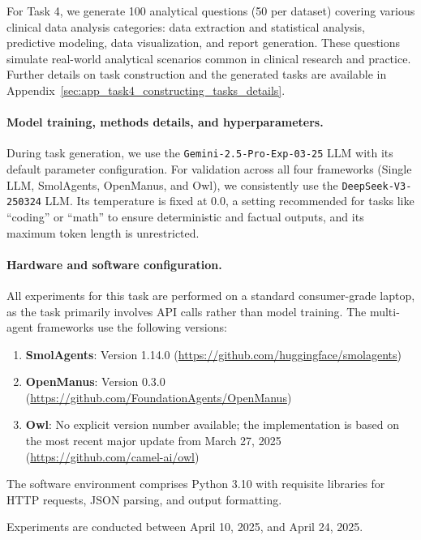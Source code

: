\documentclass{article}
\begin{document}
For Task 4, we generate 100 analytical questions (50 per dataset) covering various clinical data analysis categories: data extraction and statistical analysis, predictive modeling, data visualization, and report generation. These questions simulate real-world analytical scenarios common in clinical research and practice. Further details on task construction and the generated tasks are available in Appendix~\ref{sec:app_task4_constructing_tasks_details}.

\paragraph{Model training, methods details, and hyperparameters.}
\label{sec:app_task4_models_hyperparams}
During task generation, we use the \texttt{Gemini-2.5-Pro-Exp-03-25} LLM with its default parameter configuration. For validation across all four frameworks (Single LLM, SmolAgents, OpenManus, and Owl), we consistently use the \texttt{DeepSeek-V3-250324} LLM. Its temperature is fixed at 0.0, a setting recommended for tasks like ``coding'' or ``math'' to ensure deterministic and factual outputs, and its maximum token length is unrestricted.

\paragraph{Hardware and software configuration.}
\label{sec:app_task4_hardware_software}
All experiments for this task are performed on a standard consumer-grade laptop, as the task primarily involves API calls rather than model training. The multi-agent frameworks use the following versions:
\begin{enumerate}
    \item \textbf{SmolAgents}: Version 1.14.0 (\url{https://github.com/huggingface/smolagents})
    \item \textbf{OpenManus}: Version 0.3.0 (\url{https://github.com/FoundationAgents/OpenManus})
    \item \textbf{Owl}: No explicit version number available; the implementation is based on the most recent major update from March 27, 2025 (\url{https://github.com/camel-ai/owl})
\end{enumerate}

The software environment comprises Python 3.10 with requisite libraries for HTTP requests, JSON parsing, and output formatting.

Experiments are conducted between April 10, 2025, and April 24, 2025.
\end{document}
